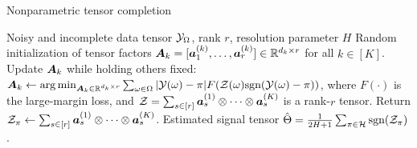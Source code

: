 \documentclass[10pt]{article}
\def\sign{\textup{sgn}}
\newcommand\Algphase[1]{%
\vspace*{-.7\baselineskip}\Statex\hspace*{\dimexpr-\algorithmicindent-2pt\relax}\rule{\textwidth}{0.4pt}%
\Statex\hspace*{-\algorithmicindent}\textbf{#1}%
\vspace*{-.7\baselineskip}\Statex\hspace*{\dimexpr-\algorithmicindent-2pt\relax}\rule{\textwidth}{0.4pt}%
}
\begin{document}
\begin{algorithm}
  \caption{Nonparametric tensor completion}\label{alg:tensorT}
 \begin{algorithmic}[1] 
\INPUT  Noisy and incomplete data tensor $\mathcal{Y}_\Omega$, rank $r$, resolution parameter $H$
\State Random initialization of tensor factors $\bm A_k=[\bm{a}^{(k)}_1,\ldots,\bm{a}^{(k)}_r]\in\mathbb{R}^{d_k\times r}$ for all $k\in[K]$. 
\State Update $\bm A_k$ while holding others fixed: $\mA_k\leftarrow \argmin_{\mA_k\in\mathbb{R}^{d_k\times r}}\sum_{\omega\in \Omega} |\tY(\omega)-\pi|F(\tZ(\omega)\sign(\tY(\omega)-\pi))$, where $F(\cdot)$ is the large-margin loss, and $\mathcal{Z}=\sum_{s\in[r]} \bm{a}^{(1)}_s\otimes \cdots\otimes \bm{a}^{(K)}_s$ is a rank-$r$ tensor. 
\EndFor
\EndWhile
\State Return $\mathcal{Z}_\pi\leftarrow \sum_{s\in[r]} \bm{a}^{(1)}_s\otimes \cdots\otimes \bm{a}^{(K)}_s$.
\EndFor
\OUTPUT Estimated signal tensor $\hat \Theta={1\over 2H+1}\sum_{\pi \in \tH}\sign(\tZ_\pi)$.
    \end{algorithmic}
\end{algorithm}
\end{document}
